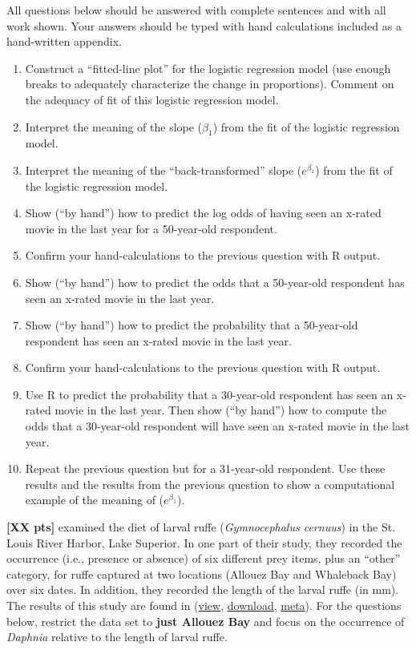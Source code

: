 \documentclass[10pt,openany]{book}\usepackage[]{graphicx}\usepackage[]{color}
\begin{document}
\begin{hwsection}{All questions below should be answered with complete sentences and with all work shown.  Your answers should be typed with hand calculations included as a hand-written appendix.}
    \begin{enumerate}
      \item Construct a ``fitted-line plot'' for the logistic regression model (use enough breaks to adequately characterize the change in proportions).  Comment on the adequacy of fit of this logistic regression model.
      \item Interpret the meaning of the slope ($\beta_{1}$) from the fit of the logistic regression model.
      \item Interpret the meaning of the ``back-transformed'' slope ($e^{\beta_{1}}$) from the fit of the logistic regression model.
      \item Show (``by hand'') how to predict the log odds of having seen an x-rated movie in the last year for a 50-year-old respondent.
      \item Confirm your hand-calculations to the previous question with R output.
      \item Show (``by hand'') how to predict the odds that a 50-year-old respondent has seen an x-rated movie in the last year.
      \item Show (``by hand'') how to predict the probability that a 50-year-old respondent has seen an x-rated movie in the last year.
      \item Confirm your hand-calculations to the previous question with R output.
      \item Use R to predict the probability that a 30-year-old respondent has seen an x-rated movie in the last year.  Then show (``by hand'') how to compute the odds that a 30-year-old respondent will have seen an x-rated movie in the last year.
      \item Repeat the previous question but for a 31-year-old respondent.  Use these results and the results from the previous question to show a computational example of the meaning of ($e^{\beta_{1}}$).
    \end{enumerate}

\newpage
  \item \label{hwprob:LMlogisticRuffe1} \textbf{[XX pts]}  \cite{Ogleetal2004} examined the diet of larval ruffe (\emph{Gymnocephalus cernuus}) in the St. Louis River Harbor, Lake Superior.  In one part of their study, they recorded the occurrence (i.e., presence or absence) of six different prey items, plus an ``other'' category, for ruffe captured at two locations (Allouez Bay and Whaleback Bay) over six dates.  In addition, they recorded the length of the larval ruffe (in mm).  The results of this study are found in  (\href{https://github.com/droglenc/NCData/blob/master/RuffeLarvalDiet.csv}{view}, \href{https://raw.githubusercontent.com/droglenc/NCData/master/RuffeLarvalDiet.csv}{download}, \href{https://github.com/droglenc/NCData/blob/master/RuffeLarvalDiet_meta.txt}{meta}).  For the questions below, restrict the data set to \textbf{just Allouez Bay} and focus on the occurrence of \emph{Daphnia} relative to the length of larval ruffe.


\end{hwsection}
\end{document}
